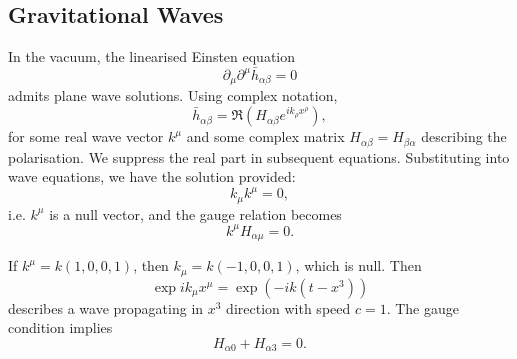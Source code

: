 \documentclass[12pt]{article}
\begin{document}
\subsection{Gravitational Waves}
\label{sub:grav_w}

In the vacuum, the linearised Einsten equation
\[
	\partial_\mu \partial^\mu \bar h_{\alpha\beta} = 0
\]
admits plane wave solutions. Using complex notation,
\[
\bar h_{\alpha\beta} = \Re \left( H_{\alpha\beta} e^{i k_\rho x^\rho} \right),
\]
for some real wave vector $k^\mu$ and some complex matrix $H_{\alpha\beta} = H_{\beta\alpha}$ describing the polarisation. We suppress the real part in subsequent equations. Substituting into wave equations, we have the solution provided:
\[
k_\mu k^\mu = 0,
\]
i.e. $k^\mu$ is a null vector, and the gauge relation becomes
\[
k^\mu H_{\alpha\mu} = 0.
\]
\begin{exbox}
	If $k^\mu = k(1, 0, 0, 1)$, then $k_\mu = k(-1, 0, 0, 1)$, which is null. Then
	\[
	\exp i k_\mu x^\mu = \exp(-ik (t - x^3))
	\]
	describes a wave propagating in $x^3$ direction with speed $c = 1$. The gauge condition implies
	\[
	H_{\alpha0} + H_{\alpha3} = 0.
	\]
\end{exbox}
\end{document}
